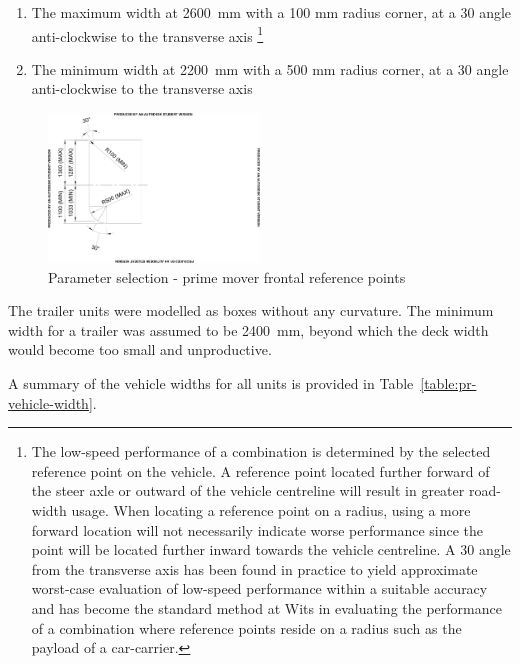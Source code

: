 \begin{enumerate}
	\item The maximum width at 2600~mm with a 100 mm radius corner, at a 30\degree{} angle anti-clockwise to the transverse axis \footnote{The low-speed performance of a combination is determined by the selected reference point on the vehicle. A reference point located further forward of the steer axle or outward of the vehicle centreline will result in greater road-width usage. When locating a reference point on a radius, using a more forward location will not necessarily indicate worse performance since the point will be located further inward towards the vehicle centreline. A 30\degree{} angle from the transverse axis has been found in practice to yield approximate worst-case evaluation of low-speed performance within a suitable accuracy and has become the standard method at Wits in evaluating the performance of a combination where reference points reside on a radius such as the payload of a car-carrier.}
	\item The minimum width at 2200~mm with a 500 mm radius corner, at a 30\degree{} angle anti-clockwise to the transverse axis
\end{enumerate}

\begin{figure}[H]
	\centering
	\includegraphics[width=0.5\textwidth]{fig/parameter-selection_vehicle-width_prime-mover}
	\caption{Parameter selection - prime mover frontal reference points}
	\label{figure:parameter-selection-vehicle-width}
\end{figure}

The trailer units were modelled as boxes without any curvature. The minimum width for a trailer was assumed to be 2400~mm, beyond which the deck width would become too small and unproductive.

A summary of the vehicle widths for all units is provided in Table~\ref{table:pr-vehicle-width}.

